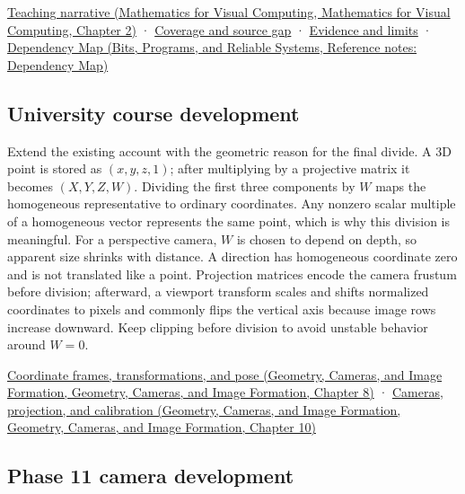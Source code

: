 \href{../02-Mathematics-for-Visual-Computing/main.pdf\#nameddest=01-foundations-i-ch018-homogeneous-coordinates-preserve-the-role-of-a-location}{Teaching narrative (Mathematics for Visual Computing, Mathematics for Visual Computing, Chapter 2)} · \hyperref[appendix-fd090d982a15-phase-6---parts-501-600]{Coverage and source gap} · \hyperref[appendix-a103e7846d21-phase-6---source-analysis-and-verification]{Evidence and limits} · \href{../01-Bits-Programs-and-Reliable-Systems/main.pdf\#nameddest=appendix-4ad47bdd269a}{Dependency Map (Bits, Programs, and Reliable Systems, Reference notes: Dependency Map)}

\subsection{University course development}\label{appendix-cb3b26862282-university-course-development}

Extend the existing account with the geometric reason for the final divide. A 3D point is stored as \((x,y,z,1)\); after multiplying by a projective matrix it becomes \((X,Y,Z,W)\). Dividing the first three components by \(W\) maps the homogeneous representative to ordinary coordinates. Any nonzero scalar multiple of a homogeneous vector represents the same point, which is why this division is meaningful. For a perspective camera, \(W\) is chosen to depend on depth, so apparent size shrinks with distance. A direction has homogeneous coordinate zero and is not translated like a point. Projection matrices encode the camera frustum before division; afterward, a viewport transform scales and shifts normalized coordinates to pixels and commonly flips the vertical axis because image rows increase downward. Keep clipping before division to avoid unstable behavior around \(W=0\).

\href{../03-Geometry-Cameras-and-Image-Formation/main.pdf\#nameddest=03-visual-computing-i-ch001-coordinate-frames-transformations-and-pose}{Coordinate frames, transformations, and pose (Geometry, Cameras, and Image Formation, Geometry, Cameras, and Image Formation, Chapter 8)} · \href{../03-Geometry-Cameras-and-Image-Formation/main.pdf\#nameddest=03-visual-computing-i-ch003-cameras-projection-and-calibration}{Cameras, projection, and calibration (Geometry, Cameras, and Image Formation, Geometry, Cameras, and Image Formation, Chapter 10)}

\subsection{Phase 11 camera development}\label{appendix-cb3b26862282-phase-11-camera-development}

